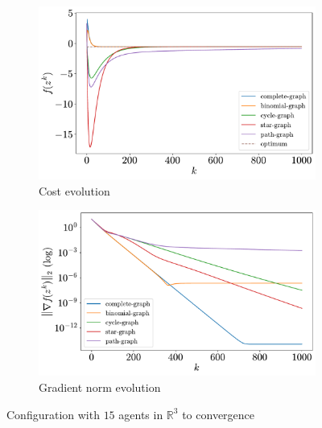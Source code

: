 \documentclass[a4paper,11pt,oneside]{book}
\begin{document}
\begin{figure}[H]
      \centering
      \begin{subfigure}[t]{0.49\textwidth}
            \centering
            \includegraphics[width=\linewidth]{./figs/quadratic/cost_15_3_1000.pdf} 
            \caption{Cost evolution}
      \end{subfigure}
      \hfill
      \begin{subfigure}[t]{0.49\textwidth}
            \centering
            \includegraphics[width=\linewidth]{./figs/quadratic/gradient_15_3_1000.pdf} 
            \caption{Gradient norm evolution}
      \end{subfigure}
      \caption{Configuration with $15$ agents in $\mathbb{R}^{3}$ to convergence}
\end{figure}
\end{document}
